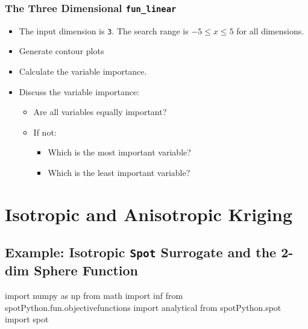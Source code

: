 \documentclass[
  letterpaper,
  DIV=11,
  numbers=noendperiod]{scrreprt}
\newenvironment{Shaded}{\begin{snugshade}}{\end{snugshade}}
\newcommand{\ImportTok}[1]{\textcolor[rgb]{0.00,0.46,0.62}{#1}}
\newcommand{\NormalTok}[1]{\textcolor[rgb]{0.00,0.23,0.31}{#1}}
\providecommand{\tightlist}{%
  \setlength{\itemsep}{0pt}\setlength{\parskip}{0pt}}\usepackage{longtable,booktabs,array}
\begin{document}
\hypertarget{the-three-dimensional-fun_linear}{%
\subsection{\texorpdfstring{The Three Dimensional
\texttt{fun\_linear}}{The Three Dimensional fun\_linear}}\label{the-three-dimensional-fun_linear}}

\begin{itemize}
\tightlist
\item
  The input dimension is \texttt{3}. The search range is
  \(-5 \leq x \leq 5\) for all dimensions.
\item
  Generate contour plots
\item
  Calculate the variable importance.
\item
  Discuss the variable importance:

  \begin{itemize}
  \tightlist
  \item
    Are all variables equally important?
  \item
    If not:

    \begin{itemize}
    \tightlist
    \item
      Which is the most important variable?
    \item
      Which is the least important variable?
    \end{itemize}
  \end{itemize}
\end{itemize}

\hypertarget{sec-iso-aniso-kriging}{%
\chapter{Isotropic and Anisotropic
Kriging}\label{sec-iso-aniso-kriging}}

\hypertarget{example-isotropic-spot-surrogate-and-the-2-dim-sphere-function}{%
\section{\texorpdfstring{Example: Isotropic \texttt{Spot} Surrogate and
the 2-dim Sphere
Function}{Example: Isotropic Spot Surrogate and the 2-dim Sphere Function}}\label{example-isotropic-spot-surrogate-and-the-2-dim-sphere-function}}

\begin{Shaded}
\begin{Highlighting}[]
\ImportTok{import}\NormalTok{ numpy }\ImportTok{as}\NormalTok{ np}
\ImportTok{from}\NormalTok{ math }\ImportTok{import}\NormalTok{ inf}
\ImportTok{from}\NormalTok{ spotPython.fun.objectivefunctions }\ImportTok{import}\NormalTok{ analytical}
\ImportTok{from}\NormalTok{ spotPython.spot }\ImportTok{import}\NormalTok{ spot}
\end{Highlighting}
\end{Shaded}
\end{document}
